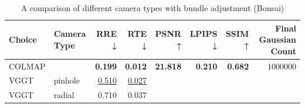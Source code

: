 \begin{table}[H]
\caption{A comparison of different camera types with bundle adjustment (Bonsai)}
\label{tab:10_camera_type_bonsai}
\begin{tabular}{llrrrrrr}
\toprule
Choice & Camera Type & RRE ↓ & RTE ↓ & PSNR ↑ & LPIPS ↓ & SSIM ↑ & Final Gaussian Count \\
\midrule
COLMAP &  & \textbf{0.199} & \textbf{0.012} & \textbf{21.818} & \textbf{0.210} & \textbf{0.682} & 1000000 \\
VGGT & pinhole & \underline{0.510} & \underline{0.027} &  &  &  &  \\
VGGT & radial & 0.710 & 0.037 &  &  &  &  \\
\bottomrule
\end{tabular}
\end{table}
